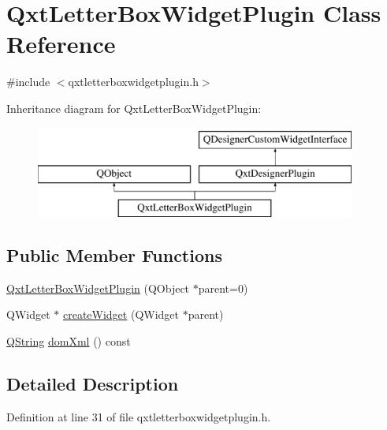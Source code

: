 \hypertarget{class_qxt_letter_box_widget_plugin}{\section{Qxt\-Letter\-Box\-Widget\-Plugin Class Reference}
\label{class_qxt_letter_box_widget_plugin}
}


{\ttfamily \#include $<$qxtletterboxwidgetplugin.\-h$>$}

Inheritance diagram for Qxt\-Letter\-Box\-Widget\-Plugin\-:\begin{figure}[H]
\begin{center}
\leavevmode
\includegraphics[height=3.000000cm]{class_qxt_letter_box_widget_plugin}
\end{center}
\end{figure}
\subsection*{Public Member Functions}
\begin{DoxyCompactItemize}
\item 
\hyperlink{class_qxt_letter_box_widget_plugin_a1269efe98ba3ad74e4507dce9ce298ed}{Qxt\-Letter\-Box\-Widget\-Plugin} (Q\-Object $\ast$parent=0)
\item 
Q\-Widget $\ast$ \hyperlink{class_qxt_letter_box_widget_plugin_a5c2f31592be9add1ec2a4e6b983926f8}{create\-Widget} (Q\-Widget $\ast$parent)
\item 
\hyperlink{group___u_a_v_objects_plugin_gab9d252f49c333c94a72f97ce3105a32d}{Q\-String} \hyperlink{class_qxt_letter_box_widget_plugin_afa1f694afcf0e3f0f5b81346c6523c5d}{dom\-Xml} () const 
\end{DoxyCompactItemize}


\subsection{Detailed Description}


Definition at line 31 of file qxtletterboxwidgetplugin.\-h.



